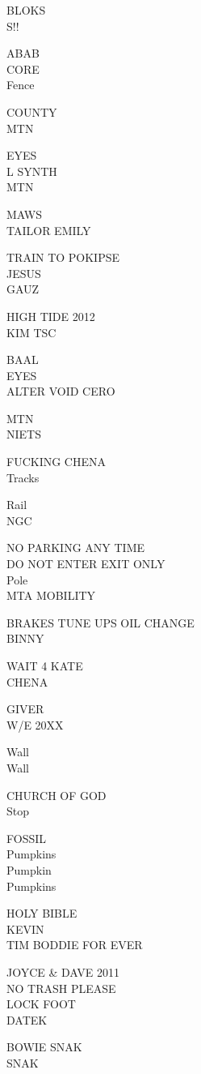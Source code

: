 \documentclass[10pt,letterpaper]{article}
\begin{document}
BLOKS\\
S!!

ABAB\\
CORE\\
Fence

COUNTY\\
MTN

EYES\\
L SYNTH\\
MTN

MAWS\\
TAILOR EMILY

TRAIN TO POKIPSE\\
JESUS\\
GAUZ

HIGH TIDE 2012\\
KIM TSC

BAAL\\
EYES\\
ALTER VOID CERO

MTN\\
NIETS

FUCKING CHENA\\
Tracks

Rail\\
NGC

NO PARKING ANY TIME\\
DO NOT ENTER EXIT ONLY\\
Pole\\
MTA MOBILITY

BRAKES TUNE UPS OIL CHANGE\\
BINNY

WAIT 4 KATE\\
CHENA

GIVER\\
W/E 20XX

Wall\\
Wall

CHURCH OF GOD\\
Stop

FOSSIL\\
Pumpkins\\
Pumpkin\\
Pumpkins

HOLY BIBLE\\
KEVIN\\
TIM BODDIE FOR EVER

JOYCE \& DAVE 2011\\
NO TRASH PLEASE\\
LOCK FOOT\\
DATEK

BOWIE SNAK\\
SNAK
\end{document}
